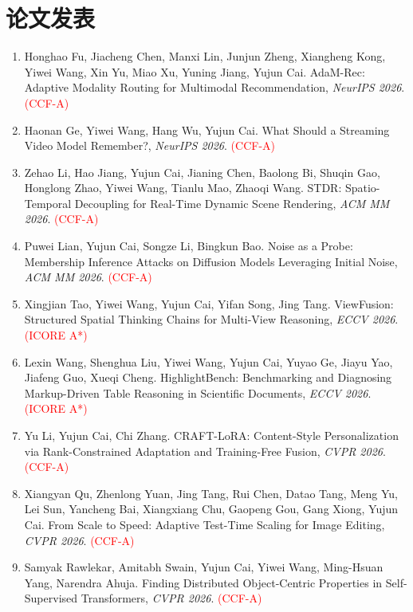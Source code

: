 \section*{论文发表}
\begin{enumerate}
\item Honghao Fu, Jiacheng Chen, Manxi Lin, Junjun Zheng, Xiangheng Kong, Yiwei Wang, Xin Yu, Miao Xu, Yuning Jiang, Yujun Cai. AdaM-Rec: Adaptive Modality Routing for Multimodal Recommendation, \textit{NeurIPS 2026}. \textcolor{red}{(CCF-A)}

\item Haonan Ge, Yiwei Wang, Hang Wu, Yujun Cai. What Should a Streaming Video Model Remember?, \textit{NeurIPS 2026}. \textcolor{red}{(CCF-A)}

\item Zehao Li, Hao Jiang, Yujun Cai, Jianing Chen, Baolong Bi, Shuqin Gao, Honglong Zhao, Yiwei Wang, Tianlu Mao, Zhaoqi Wang. STDR: Spatio-Temporal Decoupling for Real-Time Dynamic Scene Rendering, \textit{ACM MM 2026}. \textcolor{red}{(CCF-A)}

\item Puwei Lian, Yujun Cai, Songze Li, Bingkun Bao. Noise as a Probe: Membership Inference Attacks on Diffusion Models Leveraging Initial Noise, \textit{ACM MM 2026}. \textcolor{red}{(CCF-A)}

\item Xingjian Tao, Yiwei Wang, Yujun Cai, Yifan Song, Jing Tang. ViewFusion: Structured Spatial Thinking Chains for Multi-View Reasoning, \textit{ECCV 2026}. \textcolor{red}{(ICORE A*)}

\item Lexin Wang, Shenghua Liu, Yiwei Wang, Yujun Cai, Yuyao Ge, Jiayu Yao, Jiafeng Guo, Xueqi Cheng. HighlightBench: Benchmarking and Diagnosing Markup-Driven Table Reasoning in Scientific Documents, \textit{ECCV 2026}. \textcolor{red}{(ICORE A*)}

\item Yu Li, Yujun Cai, Chi Zhang. CRAFT-LoRA: Content-Style Personalization via Rank-Constrained Adaptation and Training-Free Fusion, \textit{CVPR 2026}. \textcolor{red}{(CCF-A)}

\item Xiangyan Qu, Zhenlong Yuan, Jing Tang, Rui Chen, Datao Tang, Meng Yu, Lei Sun, Yancheng Bai, Xiangxiang Chu, Gaopeng Gou, Gang Xiong, Yujun Cai. From Scale to Speed: Adaptive Test-Time Scaling for Image Editing, \textit{CVPR 2026}. \textcolor{red}{(CCF-A)}

\item Samyak Rawlekar, Amitabh Swain, Yujun Cai, Yiwei Wang, Ming-Hsuan Yang, Narendra Ahuja. Finding Distributed Object-Centric Properties in Self-Supervised Transformers, \textit{CVPR 2026}. \textcolor{red}{(CCF-A)}


\end{enumerate}
